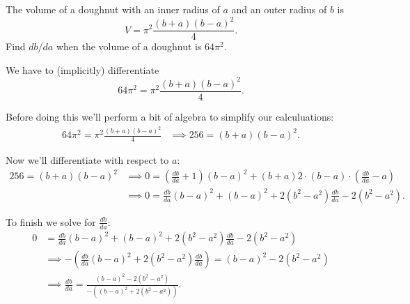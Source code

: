 \documentclass[nooutcomes]{ximera}
\begin{document}
\begin{problem}
  The volume of a doughnut with an inner radius of $a$ and an outer radius of $b$ is 
  \[
    V = \pi^2 \frac{(b+a)(b-a)^2}{4}.
  \]
  Find $db/da$ when the volume of a doughnut is $64\pi^2$.
\begin{freeResponse}
  We have to (implicitly) differentiate
  \[
    64\pi^2 = \pi^2 \frac{(b+a)(b-a)^2}{4}.
  \]
  
  Before doing this we'll perform a bit of algebra to simplify our calculuations:
  \begin{align*}
    64\pi^2 = \pi^2 \frac{(b+a)(b-a)^2}{4} &\implies 256 =  (b+a)(b-a)^2.
  \end{align*}

  Now we'll differentiate with respect to $a$:
  \begin{align*}
    256 = (b+a)(b-a)^2 &\implies 0 = \left(\frac{db}{da} + 1\right)(b - a)^2 + (b + a) 2 \cdot (b - a) \cdot \left(\frac{db}{da} - a\right) \\
    &\implies 0 = \frac{db}{da}(b-a)^2 + (b-a)^2 + 2(b^2-a^2) \frac{db}{da} - 2(b^2 - a^2).
  \end{align*}

  To finish we solve for $\frac{db}{da}$:
  \begin{align*}
    0 &= \frac{db}{da}(b-a)^2 + (b-a)^2 + 2(b^2-a^2) \frac{db}{da} - 2(b^2 - a^2) \\
      &\implies
        - \left(\frac{db}{da}(b-a)^2 + 2(b^2-a^2) \frac{db}{da}\right) = (b-a)^2 - 2(b^2 - a^2)\\
    &\implies
      \frac{db}{da} = \frac{(b-a)^2 - 2(b^2 - a^2)}{-((b-a)^2 + 2(b^2-a^2))}.
  \end{align*}
\end{freeResponse}	
\end{problem}
\end{document}
